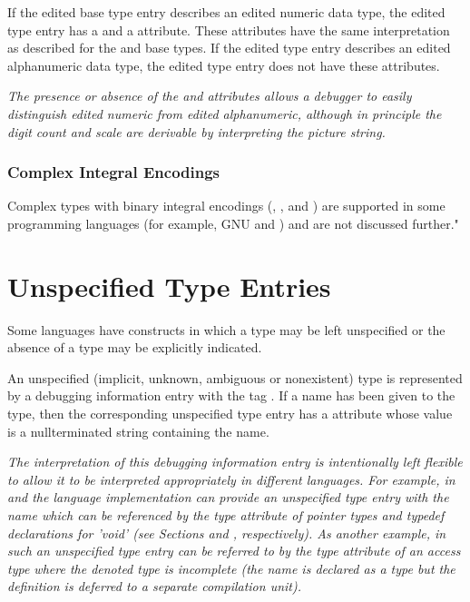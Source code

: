 {
If the edited base type entry describes an edited numeric
data type, the edited type entry has a \DWATdigitcount{} and a
\DWATdecimalscale{} attribute.
These attributes have the same
interpretation as described for the 
\DWATEpackeddecimal{} and
\DWATEnumericstring{} base 
types. If the edited type entry
describes an edited alphanumeric data type, the edited type
entry does not have these attributes.

\textit{The presence or absence of the \DWATdigitcount{} and
\DWATdecimalscale{} attributes
allows a debugger to easily
distinguish edited numeric from edited alphanumeric, although
in principle the digit count and scale are derivable by
interpreting the picture string.}

\bb
\subsubsection{Complex Integral Encodings}
\label{chap:complexintegralencodings}
Complex types with binary integral encodings (\DWATEcomplexsigned,
\DWATEimaginarysigned, \DWATEcomplexunsigned{} and
\DWATEimaginaryunsigned) are supported in some programming
languages (for example, GNU \C{} and \Rust) and are not discussed further."
\eb

\section{Unspecified Type Entries}
\label{chap:unspecifiedtypeentries}
Some languages have constructs in which a type 
may be left unspecified or the absence of a type
may be explicitly indicated.

An unspecified (implicit, unknown, ambiguous or nonexistent)
type is represented by a debugging information entry with
the tag \DWTAGunspecifiedtypeTARG. 
If a name has been given
to the type, then the corresponding unspecified type entry
has a \DWATname{} attribute 
whose value is
a null\dash terminated
string containing the name.

\textit{The interpretation of this debugging information entry is
intentionally left flexible to allow it to be interpreted
appropriately in different languages. For example, in \C{} and
\Cplusplus{} the language implementation can provide an unspecified type
entry with the name  which can be referenced by the
type attribute of pointer types and typedef declarations for
'void' (see Sections  and 
\db
{}, 
respectively). As another
example, in  such an unspecified type entry can be referred
to by the type attribute of an access type where the denoted
type is incomplete (the name is declared as a type but the
definition is deferred to a separate compilation unit).}

}
